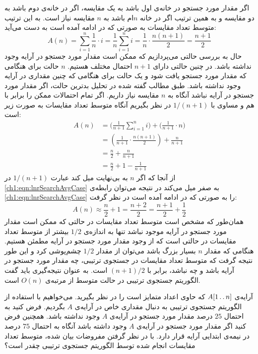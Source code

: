 {اگر مقدار مورد جستجو در خانه‌ی اول باشد به یک مقایسه، اگر در خانه‌ی دوم باشد به دو مقایسه و به همین ترتیب اگر در خانه {$n$}ام باشد به {$n$} مقایسه نیاز است. به این ترتیب متوسط تعداد مقایسات به صورتی که در ادامه آمده است به دست می‌آید:
\begin{displaymath}
A(n)=\sum_{i=1}^n{\frac{1}{n}\cdot i}=\frac{1}{n} \sum_{i=1}^n{ i}=\frac{1}{n}\cdot \frac{n(n+1)}{2}=\frac{n+1}{2}
\end{displaymath}
حال به بررسی حالتی می‌پردازیم که ممکن است مقدار مورد جستجو در آرایه وجود نداشته باشد. در چنین حالتی دارای {$n+1$} احتمال مختلف هستیم. {$n$} حالت برای هنگامی که مقدار مورد جستجو یافت شود و یک حالت برای هنگامی که چنین مقداری در آرایه وجود نداشته باشد. طبق مطالب گفته شده در تحلیل بدترین حالت، اگر مقدار مورد جستجو در آرایه نباشد آنگاه به {$n$} مقایسه نیاز داریم. اگر تمام احتمالات ممکن را برابر با هم و مساوی با {$1/(n+1)$} در نظر بگیریم آنگاه متوسط تعداد مقایسات به صورت زیر است:
\begin{align}
A(n) &= \biggl( \frac{1}{n+1} \sum_{i=1}^{n}{i} \biggr) + \biggl(\frac{1}{n+1}\cdot n \biggr) \nonumber\\
&=  \left( \frac{1}{n+1}\cdot  \frac{n(n+1)}{2} \right) + \frac{n}{n+1} \nonumber\\
&= \frac{n}{2} + \frac{n}{n+1} \nonumber\\
&= \frac{n}{2} + 1 - \frac{1}{n+1}\label{ch1:eqn:lnrSearchAvgCase}
\end{align}
از آنجا که اگر {$n$} به بی‌نهایت میل کند عبارت {$1/(n+1)$} در {\eqref{ch1:eqn:lnrSearchAvgCase}} به صفر میل می‌کند در نتیجه می‌توان رابطه‌ی {\eqref{ch1:eqn:lnrSearchAvgCase}} را به صورتی که در ادامه آمده است در نظر گرفت:
\begin{displaymath}
A(n)\approx\frac{n}{2}+1=\frac{n+2}{2}=\frac{n+1}{2}+\frac{1}{2}
\end{displaymath}
همان‌طور که مشخص است متوسط تعداد مقایسات در حالتی که ممکن است مقدار مورد جستجو در آرایه موجود نباشد تنها به اندازه‌ی {$1/2$} بیشتر از متوسط تعداد مقایسات در حالتی است که از وجود مقدار مورد جستجو در آرایه مطمئن هستیم. هنگامی که مقدار {$n$} بسیار بزرگ باشد می‌توان از مقدار {$1/2$} چشم‌پوشی کرد و این طور نتیجه گرفت که متوسط تعداد مقایسات در جستجوی ترتیبی، چه مقدار مورد جستجو در آرایه باشد و چه نباشد، برابر با {$(n+1)/2$} است. به عنوان نتیجه‌گیری باید گفت الگوریتم جستجوی ترتیبی در حالت متوسط از مرتبه‌ی {$O(n)$} است.

 آرایه‌ی {$A[1\mathinner{\ldotp\ldotp} n]$} که حاوی اعداد متمایز است را در نظر بگیرید. می‌خواهیم با استفاده از الگوریتم جستجوی ترتیبی به دنبال مقداری خاص در آرایه‌ی {$A$} بگردیم. فرض کنید به احتمال {$25$} درصد مقدار مورد جستجو در آرایه‌ی {$A$} وجود نداشته باشد. همچنین فرض کنید اگر مقدار مورد جستجو در آرایه‌ی {$A$} وجود داشته باشد آنگاه به احتمال {$75$} درصد در نیمه‌ی ابتدایی آرایه قرار دارد. با در نظر گرفتن مفروضات بیان شده، متوسط تعداد مقایسات انجام ‌شده توسط الگوریتم جستجوی ترتیبی چقدر است؟

}
